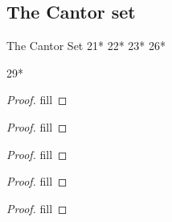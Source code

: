 \subsection{The Cantor set}

The Cantor Set
21*
22*
23*
26*

29*

\begin{exercise}{21}
\end{exercise}
\begin{proof}
fill
\end{proof} 

\begin{exercise}{22}
\end{exercise}
\begin{proof}
fill
\end{proof} 

\begin{exercise}{23}
\end{exercise}
\begin{proof}
fill
\end{proof} 

\begin{exercise}{26}
\end{exercise}
\begin{proof}
fill
\end{proof} 

\begin{exercise}{29}
\end{exercise}
\begin{proof}
fill
\end{proof}
